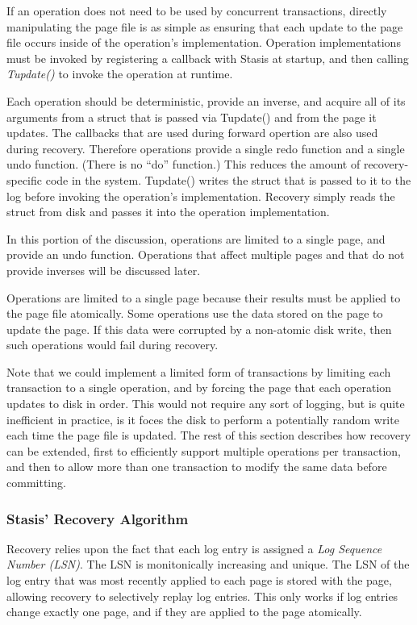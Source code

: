 \documentclass[letterpaper,twocolumn,10pt]{article}
\newcommand{\yad}{Stasis\xspace}
\newcommand{\yads}{Stasis'\xspace}
\begin{document}
If an operation does not need to be used by concurrent
transactions, directly manipulating the page file is as simple as
ensuring that each update to the page file occurs inside of the
operation's implementation.  Operation implementations must be invoked
by registering a callback with \yad at startup, and then calling {\em
Tupdate()} to invoke the operation at runtime.  

Each operation should be deterministic, provide an inverse, and
acquire all of its arguments from a struct that is passed via
Tupdate() and from the page it updates.  The callbacks that are used
during forward opertion are also used during recovery.  Therefore
operations provide a single redo function and a single undo function.
(There is no ``do'' function.)  This reduces the amount of
recovery-specific code in the system.  Tupdate() writes the struct
that is passed to it to the log before invoking the operation's
implementation.  Recovery simply reads the struct from disk and passes
it into the operation implementation.

In this portion of the discussion, operations are limited
to a single page, and provide an undo function.  Operations that
affect multiple pages and that do not provide inverses will be
discussed later.

Operations are limited to a single page because their results must be
applied to the page file atomically.  Some operations use the data
stored on the page to update the page.  If this data were corrupted by
a non-atomic disk write, then such operations would fail during recovery.

Note that we could implement a limited form of transactions by
limiting each transaction to a single operation, and by forcing the
page that each operation updates to disk in order.  This would not
require any sort of logging, but is quite inefficient in practice, is
it foces the disk to perform a potentially random write each time the
page file is updated.  The rest of this section describes how recovery
can be extended, first to efficiently support multiple operations per
transaction, and then to allow more than one transaction to modify the
same data before committing.

\subsubsection{\yads Recovery Algorithm}

Recovery relies upon the fact that each log entry is assigned a {\em
Log Sequence Number (LSN)}.  The LSN is monitonically increasing and
unique.  The LSN of the log entry that was most recently applied to
each page is stored with the page, allowing recovery to selectively
replay log entries.  This only works if log entries change exactly one
page, and if they are applied to the page atomically.
\end{document}
